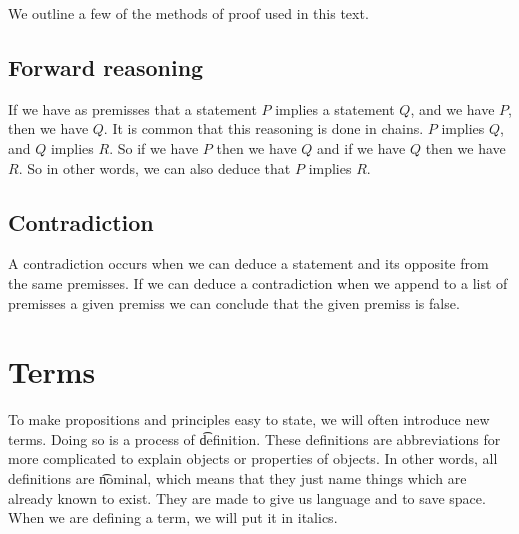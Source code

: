 We outline a few of the methods of proof used in this text.

\subsection*{Forward reasoning}

If we have as premisses that a statement $P$ implies a statement $Q$, and we have $P$, then we have $Q$.
It is common that this reasoning is done in chains.
$P$ implies $Q$, and $Q$ implies $R$. So if we have $P$ then we have $Q$ and if we have $Q$ then we have $R$.
So in other words, we can also deduce that $P$ implies $R$.

\subsection*{Contradiction}

A contradiction occurs when we can deduce a statement and its opposite from the same premisses.
If we can deduce a contradiction when we append to a list of premisses a given premiss we can conclude that the given premiss is false.

\section*{Terms}

To make propositions and principles easy to state, we will often introduce new terms.
Doing so is a process of \t{definition}.
These definitions are abbreviations for more complicated to explain objects or properties of objects.
In other words, all definitions are \t{nominal}, which means that they just name things which are already known to exist.
They are made to give us language and to save space.
When we are defining a term, we will put it in italics.



\blankpage